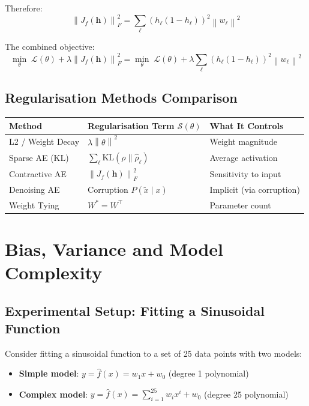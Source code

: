 \documentclass[12pt,a4paper]{article}
\newcommand{\norm}[1]{\left\|#1\right\|}
\newcommand{\vh}{\mathbf{h}}
\newcommand{\Loss}{\mathcal{L}}
\newcommand{\Reg}{\mathcal{S}}
\begin{document}
Therefore:
\[
  \norm{J_f(\vh)}_F^2
  = \sum_\ell (h_\ell(1-h_\ell))^2 \norm{w_\ell}^2
\]

The combined objective:
\[
  \min_{\theta}\;\Loss(\theta) + \lambda\norm{J_f(\vh)}_F^2
  = \min_{\theta}\;\Loss(\theta) + \lambda\sum_\ell(h_\ell(1-h_\ell))^2\norm{w_\ell}^2
\]

\subsection{Regularisation Methods Comparison}

\begin{center}
\begin{tabular}{lll}
\toprule
\textbf{Method} & \textbf{Regularisation Term $\Reg(\theta)$} & \textbf{What It Controls}\\
\midrule
L2 / Weight Decay & $\lambda\norm{\theta}^2$ & Weight magnitude \\
Sparse AE (KL) & $\sum_\ell\mathrm{KL}(\rho\|\hat{\rho}_\ell)$ & Average activation \\
Contractive AE & $\norm{J_f(\vh)}_F^2$ & Sensitivity to input \\
Denoising AE & Corruption $P(\tilde{x}\mid x)$ & Implicit (via corruption) \\
Weight Tying & $W^* = W^\top$ & Parameter count \\
\bottomrule
\end{tabular}
\end{center}

\section{Bias, Variance and Model Complexity}

\subsection{Experimental Setup: Fitting a Sinusoidal Function}

Consider fitting a sinusoidal function to a set of 25 data points with two models:
\begin{itemize}
  \item \textbf{Simple model}: $y = \hat{f}(x) = w_1 x + w_0$ (degree 1 polynomial)
  \item \textbf{Complex model}: $y = \hat{f}(x) = \sum_{i=1}^{25}w_i x^i + w_0$ (degree 25 polynomial)
\end{itemize}
\end{document}
